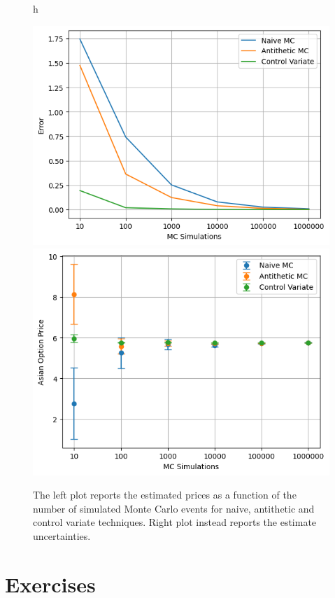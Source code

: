 \begin{figure}{h}
  \begin{center}
    \includegraphics[width=0.4\linewidth]{figures/asian_option_price}
    \includegraphics[width=0.4\linewidth]{figures/asian_option_error}
  \end{center}
  \caption{The left plot reports the estimated prices as a function of the number of simulated Monte Carlo events for naive, antithetic and control variate techniques.
    Right plot instead reports the estimate uncertainties.}
  \label{fig:asian_mc_results}
\end{figure}

\section*{Exercises}


\begin{thebibliography}{9}
\end{thebibliography}
